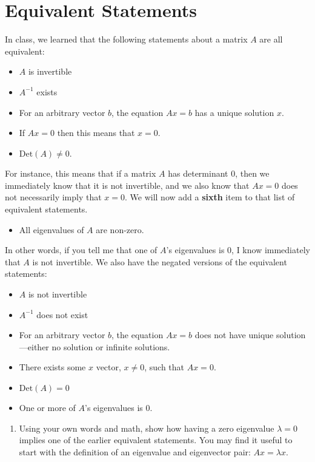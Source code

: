 \documentclass[11pt,onecolumn,superscriptaddress,notitlepage]{article}
\begin{document}
\clearpage
\section*{Equivalent Statements}
In class, we learned that the following statements about a matrix $A$ are all equivalent:
\begin{itemize}
	\item $A$ is invertible
	\item $A^{-1}$ exists
	\item For an arbitrary vector $b$, the equation $Ax=b$ has a unique solution $x$.
	\item If $Ax=0$ then this means that $x=0$. 
	\item $\text{Det}(A) \neq 0$. 
\end{itemize}
For instance, this means that if a matrix $A$ has determinant 0, then we immediately know that it is not invertible, and we also know that $Ax=0$ does not necessarily imply that $x=0$. We will now add a {\bf sixth} item to that list of equivalent statements.
\begin{itemize}
	\item All eigenvalues of $A$ are non-zero.
\end{itemize}
In other words, if you tell me that one of $A$'s eigenvalues is $0$, I know immediately that $A$ is not invertible. We also have the {\color{red} negated} versions of the equivalent statements:
{\color{red}
\begin{itemize}
	\item $A$ is not invertible
	\item $A^{-1}$ does not exist
	\item For an arbitrary vector $b$, the equation $Ax=b$ does not have unique solution---either no solution or infinite solutions.
	\item There exists some $x$ vector, $x \neq 0$, such that $Ax=0$.
	\item $\text{Det}(A) = 0$
	\item One or more of $A$'s eigenvalues is $0$.
\end{itemize}
}
\vspace{0.2in}	
\begin{enumerate}[resume]
	\item Using your own words and math, show how having a zero eigenvalue $\lambda=0$ implies one of the earlier equivalent statements. You may find it useful to start with the definition of an eigenvalue and eigenvector pair: $Ax = \lambda x$. 
\end{enumerate}
\end{document}
